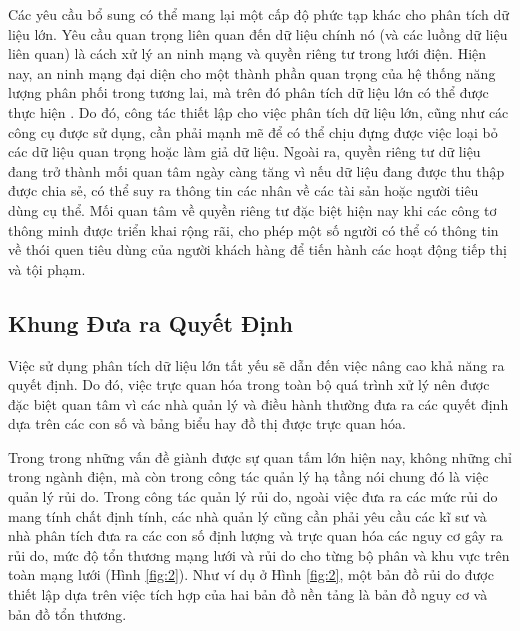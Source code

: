 \documentclass[utf8]{frontiersSCNS} %
\begin{document}
Các yêu cầu bổ sung có thể mang lại một cấp độ phức tạp khác cho phân tích dữ liệu lớn. Yêu cầu quan trọng liên quan đến dữ liệu chính nó (và các luồng dữ liệu liên quan) là cách xử lý an ninh mạng và quyền riêng tư trong lưới điện. Hiện nay, an ninh mạng đại diện cho một thành phần quan trọng của hệ thống năng lượng phân phối trong tương lai, mà trên đó phân tích dữ liệu lớn có thể được thực hiện \citep{Li2017}. Do đó, công tác thiết lập cho việc phân tích dữ liệu lớn, cũng như các công cụ được sử dụng, cần phải mạnh mẽ để có thể chịu đựng được việc loại bỏ các dữ liệu quan trọng hoặc làm giả dữ liệu. Ngoài ra, quyền riêng tư dữ liệu đang trở thành mối quan tâm ngày càng tăng vì nếu dữ liệu đang được thu thập được chia sẻ, có thể suy ra thông tin các nhân về các tài sản hoặc người tiêu dùng cụ thể. Mối quan tâm về quyền riêng tư đặc biệt hiện nay khi các công tơ thông minh được triển khai rộng rãi, cho phép một số người có thể có thông tin về thói quen tiêu dùng của người khách hàng để tiến hành các hoạt động tiếp thị và tội phạm. %

\subsection{Khung Đưa ra Quyết Định}
Việc sử dụng phân tích dữ liệu lớn tất yếu sẽ dẫn đến việc nâng cao khả năng ra quyết định. Do đó, việc trực quan hóa trong toàn bộ quá trình xử lý nên được đặc biệt quan tâm vì các nhà quản lý và điều hành thường đưa ra các quyết định dựa trên các con số và bảng biểu hay đồ thị được trực quan hóa.

Trong trong những vấn đề giành được sự quan tấm lớn hiện nay, không những chỉ trong ngành điện, mà còn trong công tác quản lý hạ tầng nói chung đó là việc quản lý rủi do. Trong công tác quản lý rủi do, ngoài việc đưa ra các mức rủi do mang tính chất định tính, các nhà quản lý cũng cần phải yêu cầu các kĩ sư và nhà phân tích đưa ra các con số định lượng và trực quan hóa các nguy cơ gây ra rủi do, mức độ tổn thương mạng lưới và rủi do cho từng bộ phân và khu vực trên toàn mạng lưới (Hình \ref{fig:2}). Như ví dụ ở Hình \ref{fig:2}, một bản đồ rủi do được thiết lập dựa trên việc tích hợp của hai bản đồ nền tảng là bản đồ nguy cơ và bản đồ tổn thương.
\end{document}
